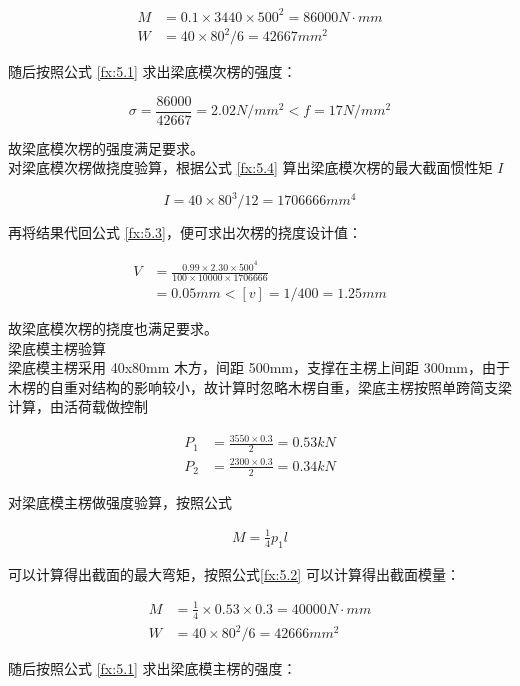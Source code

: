\begin{align*}
    M&=0.1\times 3440\times 500^2=86000 N \cdot mm\\
    W&=40\times 80^2 /6=42667 mm^2
\end{align*}

随后按照公式 \ref{fx:5.1} 求出梁底模次楞的强度：

\[
    \sigma = \frac{86000}{42667}=2.02 N/mm^2< f=17N/mm^2
\]

故梁底模次楞的强度满足要求。\\

对梁底模次楞做挠度验算，根据公式 \ref{fx:5.4} 算出梁底模次楞的最大截面惯性矩 $I$

\[
    I=40\times 80^3 /12=1706666 mm^4
\]

再将结果代回公式 \ref{fx:5.3}，便可求出次楞的挠度设计值：

\begin{align*}
    V&=\frac{0.99\times 2.30 \times 500^4}{100\times 10000\times 1706666}\\
    &=0.05 mm<[v]=1/400=1.25mm
\end{align*}

故梁底模次楞的挠度也满足要求。\\

 梁底模主楞验算\\

梁底模主楞采用 40x80mm 木方，间距 500mm，支撑在主楞上间距 300mm，由于木楞的自重对结构的影响较小，故计算时忽略木楞自重，梁底主楞按照单跨简支梁计算，由活荷载做控制

\begin{align*}    P_1&=\frac{3550\times 0.3}{2}=0.53 kN\\
    P_2&=\frac{2300\times 0.3}{2}=0.34 kN
\end{align*}

对梁底模主楞做强度验算，按照公式

\begin{align}
    \label{fx:5.A}
    M=\frac{1}{4}p_1l
\end{align}

可以计算得出截面的最大弯矩，按照公式\ref{fx:5.2} 可以计算得出截面模量：

\begin{align*}
    M&=\frac{1}{4}\times 0.53\times 0.3=40000 N \cdot mm\\
    W&=40\times 80^2 /6=42666 mm^2
\end{align*}

随后按照公式 \ref{fx:5.1} 求出梁底模主楞的强度：

